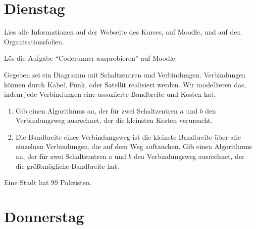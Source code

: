 \documentclass{uebung_cs}
\begin{document}
\section*{Dienstag}

\begin{aufgabe}[Orga]
    Lies alle Informationen auf der Webseite des Kurses, auf Moodle, und auf den Organisationsfolien.
\end{aufgabe}

\begin{aufgabe}[Coderunner]
    Lös die Aufgabe \enquote{Coderunner ausprobieren} auf Moodle.
\end{aufgabe}


\begin{aufgabe}[Telefonnetzwerk]
    Gegeben sei ein Diagramm mit Schaltzentren und Verbindungen.
    Verbindungen können durch Kabel, Funk, oder Satellit realisiert werden.
    Wir modellieren das, indem jede Verbindungen eine assoziierte Bandbreite und Kosten hat.
    \begin{enumerate}
        \item Gib einen Algorithmus an, der für zwei Schaltzentren $a$ und $b$ den Verbindungsweg ausrechnet, der die kleinsten Kosten verursacht.
        \item Die Bandbreite eines Verbindungsweg ist die kleinste Bandbreite über alle einzelnen Verbindungen, die auf dem Weg auftauchen.
        Gib einen Algorithmus an, der für zwei Schaltzentren $a$ und $b$ den Verbindungsweg ausrechnet, der die größtmögliche Bandbreite hat.
    \end{enumerate}
\end{aufgabe}

\begin{aufgabe}
    Eine Stadt hat 99 Polizisten.
\end{aufgabe}

\section*{Donnerstag}
\end{document}
